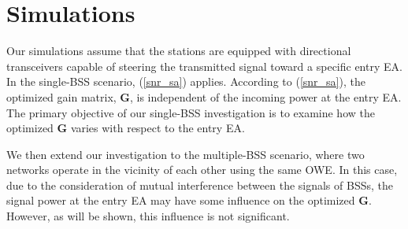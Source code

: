 \section{Simulations}
Our simulations assume that the stations are equipped with directional transceivers capable of steering the transmitted signal toward a specific entry EA. In the single-BSS scenario, (\ref{snr_sa}) applies. According to (\ref{snr_sa}), the optimized gain matrix, $\mathbf{G}$, is independent of the incoming power at the entry EA. The primary objective of our single-BSS investigation is to examine how the optimized $\mathbf{G}$ varies with respect to the entry EA.
\par
We then extend our investigation to the multiple-BSS scenario, where two networks operate in the vicinity of each other using the same OWE. In this case, due to the consideration of mutual interference between the signals of BSSs, the signal power at the entry EA may have some influence on the optimized $\mathbf{G}$. However, as will be shown, this influence is not significant.
